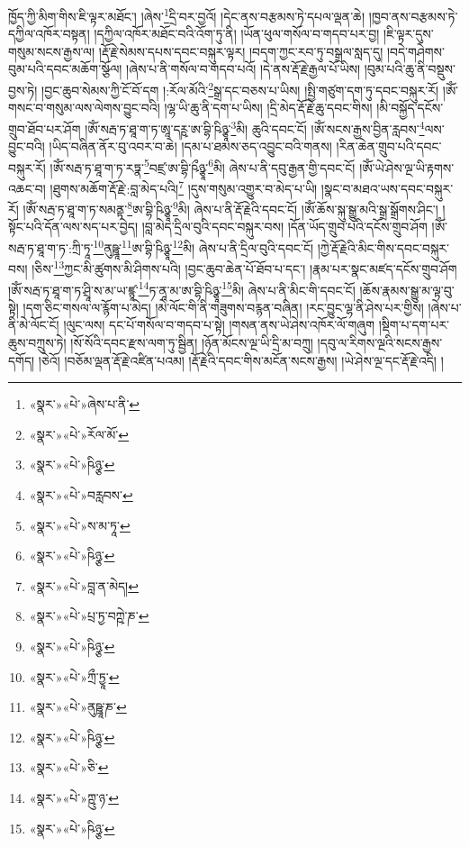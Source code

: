 ཁྱོད་ཀྱི་མིག་གིས་ཇི་ལྟར་མཐོང་། །ཞེས་\footnote{«སྣར་»«པེ་»ཞེས་པ་ནི་}དྲི་བར་བྱའོ། །དེང་ནས་བརྩམས་ཏེ་དཔལ་ལྡན་ཆེ། །ཁྱབ་ནས་བརྩམས་ཏེ་དཀྱིལ་འཁོར་བསྟན། །དཀྱིལ་འཁོར་མཐོང་བའི་འོག་ཏུ་ནི། །ཡོན་ཕུལ་གསོལ་བ་གདབ་པར་བྱ། །ཇི་ལྟར་དུས་གསུམ་སངས་རྒྱས་ལ། །རྡོ་རྗེ་སེམས་དཔས་དབང་བསྐུར་ལྟར། །བདག་ཀྱང་རབ་ཏུ་བསྒྲལ་སླད་དུ། །བདེ་གཤེགས་བུམ་པའི་དབང་མཆོག་སྩོལ། །ཞེས་པ་ནི་གསོལ་བ་གདབ་པའོ། །དེ་ནས་རྡོ་རྗེ་རྒྱལ་པོ་ཡིས། །བུམ་པའི་ཆུ་ནི་བསྡུས་བྱས་ཏེ། །བྱང་ཆུབ་སེམས་ཀྱི་ངོ་བོ་དག །:རོལ་མོའི་\footnote{«སྣར་»«པེ་»རོལ་མོ་}སྒྲ་དང་བཅས་པ་ཡིས། །སྤྱི་གཙུག་དག་ཏུ་དབང་བསྐུར་རོ། །ཨོཾ་གསང་བ་གསུམ་ལས་ལེགས་བྱུང་བའི། །ལྷ་ཡི་ཆུ་ནི་དག་པ་ཡིས། །དྲི་མེད་རྡོ་རྗེ་ཆུ་དབང་གིས། །མི་བསྐྱོད་དངོས་གྲུབ་ཐོབ་པར་ཤོག །ཨོཾ་སརྦ་ཏ་ཐཱ་ག་ཏ་ཨཱ་དཪྵ་ཨ་བྷི་ཥིཉྩཱ་\footnote{«སྣར་»«པེ་»ཥིཉྩ་}མི། ཆུའི་དབང་ངོ། །ཨོཾ་སངས་རྒྱས་བྱིན་རླབས་\footnote{«སྣར་»«པེ་»བརླབས་}ལས་བྱུང་བའི། །ཡིད་བཞིན་ནོར་བུ་འབར་བ་ཆེ། །དམ་པ་ཐམས་ཅད་འབྱུང་བའི་གནས། །རིན་ཆེན་གྲུབ་པའི་དབང་བསྐུར་རོ། །ཨོཾ་སརྦ་ཏ་ཐཱ་ག་ཏ་རཏྣ་\footnote{«སྣར་»«པེ་»ས་མ་ཏཱ་}བཛྲ་ཨ་བྷི་ཥྀཉྩཱ་\footnote{«སྣར་»«པེ་»ཥིཉྩ་}མི། ཞེས་པ་ནི་དབུ་རྒྱན་གྱི་དབང་ངོ། །ཨོཾ་ཡེ་ཤེས་ལྔ་ཡི་རྟགས་འཆང་བ། །ཐུགས་མཆོག་རྡོ་རྗེ་:བླ་མེད་པའི།\footnote{«སྣར་»«པེ་»བླ་ན་མེད།} །དུས་གསུམ་འགྱུར་བ་མེད་པ་ཡི། །སྣང་བ་མཐའ་ཡས་དབང་བསྐུར་རོ། །ཨོཾ་སརྦ་ཏ་ཐཱ་ག་ཏ་སམནྟ་\footnote{«སྣར་»«པེ་»པྲ་ཏྱ་བཀྵེ་ཎ་}ཨ་བྷི་ཥིཉྩཱ་\footnote{«སྣར་»«པེ་»ཥིཉྩ་}མི། ཞེས་པ་ནི་རྡོ་རྗེའི་དབང་ངོ། །ཨོཾ་ཆོས་སྐུ་སྒྱུ་མའི་སྒྲ་སྒྲོགས་ཤིང་། །སྟོང་པའི་དོན་ལས་སད་པར་བྱེད། །བླ་མེད་དྲིལ་བུའི་དབང་བསྐུར་བས། །དོན་ཡོད་གྲུབ་པའི་དངོས་གྲུབ་ཤོག །ཨོཾ་སརྦ་ཏ་ཐཱ་ག་ཏ་:ཀྲི་ཏཱ་\footnote{«སྣར་»«པེ་»ཀྲྀ་ཏྱཱ་}ནུཥྛཱ་\footnote{«སྣར་»«པེ་»ནུཥྛཱ་ཎ་}ཨ་བྷི་ཥིཉྩཱ་\footnote{«སྣར་»«པེ་»ཥིཉྩ་}མི། ཞེས་པ་ནི་དྲིལ་བུའི་དབང་ངོ། །ཀྱེ་རྡོ་རྗེའི་མིང་གིས་དབང་བསྐུར་བས། །ཅིས་\footnote{«སྣར་»«པེ་»ཅི་}ཀྱང་མི་ཚུགས་མི་ཤིགས་པའི། །བྱང་ཆུབ་ཆེན་པོ་ཐོབ་པ་དང་། །རྣམ་པར་སྣང་མཛད་དངོས་གྲུབ་ཤོག །ཨོཾ་སརྦ་ཏ་ཐཱ་ག་ཏ་ཤྲཱི་ས་མ་ཡ་ཛྙཱ་\footnote{«སྣར་»«པེ་»ཀྵུ་ཉ་}ཏ་ནཱ་མ་ཨ་བྷི་ཥིཉྩཱ་\footnote{«སྣར་»«པེ་»ཥིཉྩ་}མི། ཞེས་པ་ནི་མིང་གི་དབང་ངོ། །ཆོས་རྣམས་སྒྱུ་མ་ལྟ་བུ་སྟེ། །དག་ཅིང་གསལ་ལ་རྙོག་པ་མེད། །མེ་ལོང་གི་ནི་གཟུགས་བརྙན་བཞིན། །རང་བྱུང་ལྷ་ནི་ཤེས་པར་གྱིས། །ཞེས་པ་ནི་མེ་ལོང་ངོ། །ལུང་ལས། དང་པོ་གསོལ་བ་གདབ་པ་སྟེ། །གསན་ནས་ཡེ་ཤེས་འཁོར་ལོ་གཞུག །སྡིག་པ་དག་པར་ཆུས་བཀྲུས་ཏེ། །སོ་སོའི་དབང་རྫས་ལག་ཏུ་སྦྱིན། །ཉོན་མོངས་ལྔ་ཡི་དྲི་མ་བཀྲུ། །དབུ་ལ་རིགས་ལྔའི་སངས་རྒྱས་དགོད། །ཅེའོ། །བཅོམ་ལྡན་རྡོ་རྗེ་འཛིན་པའམ། །རྡོ་རྗེའི་དབང་གིས་མངོན་སངས་རྒྱས། །ཡེ་ཤེས་ལྔ་དང་རྡོ་རྗེ་འདི། །
